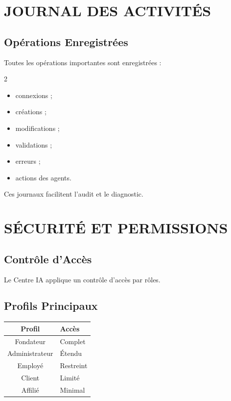 \documentclass[12pt,a4paper,oneside]{book}
\begin{document}
\chapter{JOURNAL DES ACTIVITÉS}

\section{Opérations Enregistrées}
Toutes les opérations importantes sont enregistrées :
\begin{multicols}{2}
\begin{itemize}
\item connexions ;
\item créations ;
\item modifications ;
\item validations ;
\item erreurs ;
\item actions des agents.
\end{itemize}
\end{multicols}

Ces journaux facilitent l'audit et le diagnostic.

\chapter{SÉCURITÉ ET PERMISSIONS}

\section{Contrôle d'Accès}
Le Centre IA applique un contrôle d'accès par rôles.

\section{Profils Principaux}
\begin{center}
\begin{tabular}{|c|p{10cm}|}
\hline
\rowcolor{electronblue}
\color{white}\textbf{Profil} & \color{white}\textbf{Accès} \\
\hline
Fondateur & Complet \\
\hline
Administrateur & Étendu \\
\hline
Employé & Restreint \\
\hline
Client & Limité \\
\hline
Affilié & Minimal \\
\hline
\end{tabular}
\end{center}
\end{document}
